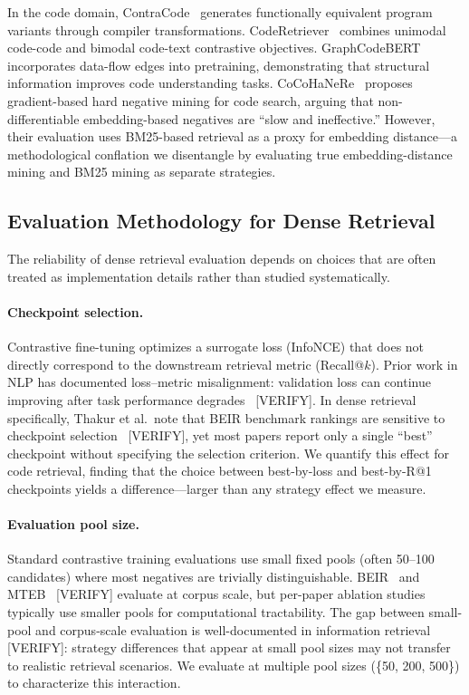 In the code domain, ContraCode~\cite{jain2021contracode} generates functionally equivalent program variants through compiler transformations.
CodeRetriever~\cite{li2022coderetriever} combines unimodal code-code and bimodal code-text contrastive objectives.
GraphCodeBERT~\cite{guo2021graphcodebert} incorporates data-flow edges into pretraining, demonstrating that structural information improves code understanding tasks.
CoCoHaNeRe~\cite{fan2025cocohanere} proposes gradient-based hard negative mining for code search, arguing that non-differentiable embedding-based negatives are ``slow and ineffective.''
However, their evaluation uses BM25-based retrieval as a proxy for embedding distance---a methodological conflation we disentangle by evaluating true embedding-distance mining and BM25 mining as separate strategies.

\subsection{Evaluation Methodology for Dense Retrieval}
\label{sec:related-eval}

The reliability of dense retrieval evaluation depends on choices that are often treated as implementation details rather than studied systematically.

\paragraph{Checkpoint selection.}
Contrastive fine-tuning optimizes a surrogate loss (InfoNCE) that does not directly correspond to the downstream retrieval metric (Recall@$k$).
Prior work in NLP has documented loss--metric misalignment: validation loss can continue improving after task performance degrades~\cite{dodge2020finetuning} [VERIFY].
In dense retrieval specifically, Thakur et al.\ note that BEIR benchmark rankings are sensitive to checkpoint selection~\cite{thakur2021beir} [VERIFY], yet most papers report only a single ``best'' checkpoint without specifying the selection criterion.
We quantify this effect for code retrieval, finding that the choice between best-by-loss and best-by-R@1 checkpoints yields a  difference---larger than any strategy effect we measure.

\paragraph{Evaluation pool size.}
Standard contrastive training evaluations use small fixed pools (often 50--100 candidates) where most negatives are trivially distinguishable.
BEIR~\cite{thakur2021beir} and MTEB~\cite{muennighoff2023mteb} [VERIFY] evaluate at corpus scale, but per-paper ablation studies typically use smaller pools for computational tractability.
The gap between small-pool and corpus-scale evaluation is well-documented in information retrieval~\cite{craswell2020overview} [VERIFY]: strategy differences that appear at small pool sizes may not transfer to realistic retrieval scenarios.
We evaluate at multiple pool sizes (\{50, 200, 500\}) to characterize this interaction.

